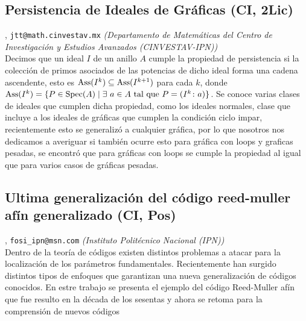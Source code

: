 \subsection{\sffamily Persistencia de Ideales de Gr\'aficas {\footnotesize (CI, 2Lic)}} \label{reg-443} 
, {\tt jtt@math.cinvestav.mx}  {\slshape (Departamento de Matem\'aticas del Centro de Investigaci\'on y Estudios Avanzados (CINVESTAV-IPN))}\\
          \noindent Decimos que un ideal $I$ de un anillo $A$ cumple la propiedad de persistencia si la colecci\'on de primos asociados de las potencias de dicho ideal forma una cadena ascendente, esto es $\texttt{\rm Ass}(I^k) \subseteq \texttt{\rm Ass}(I^{k+1}) $ para cada $k$, donde $\texttt{\rm Ass}(I^k)=\{P \in \texttt{\rm Spec}(A) \mid \exists \ a \in A \ \texttt{\rm tal que}\  P=(I^k \colon a) \}$. Se conoce varias clases de ideales que cumplen dicha propiedad, como los ideales normales, clase que incluye a los ideales de gr\'aficas que cumplen la condici\'on ciclo impar, recientemente esto se generaliz\'o a cualquier gr\'afica, por lo que nosotros nos dedicamos a averiguar si tambi\'en ocurre esto para gr\'afica con loops y graficas pesadas, se encontr\'o que para gr\'aficas con loops se cumple la propiedad al igual que para varios casos de gr\'aficas pesadas.
\subsection{\sffamily Ultima generalizaci\'on del c\'odigo reed-muller af\'in generalizado {\footnotesize (CI, Pos)}} \label{reg-1813} 
, {\tt fosi\_ipn@msn.com}  {\slshape (Instituto Polit\'ecnico Nacional (IPN))}\\
          \noindent Dentro de la  teor\'ia de c\'odigos existen distintos problemas a atacar para la localizaci\'on de los par\'ametros fundamentales. Recientemente han surgido distintos tipos de enfoques que garantizan una nueva generalizaci\'on de c\'odigos conocidos. En estre trabajo se presenta el ejemplo del c\'odigo Reed-Muller af\'in que fue resulto en la d\'ecada de los sesentas y ahora se retoma para la  comprensi\'on de nuevos c\'odigos
